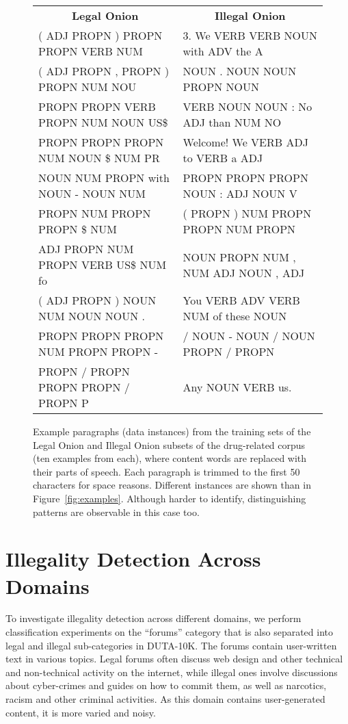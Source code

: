 \documentclass[11pt,a4paper,table]{article}
\begin{document}
\begin{figure*}[t]
\centering
\small
\begin{tabular}{l|l}
\multicolumn{1}{c}{\textbf{Legal Onion}} &
\multicolumn{1}{c}{\textbf{Illegal Onion}}\\[.1cm]
( ADJ PROPN ) PROPN PROPN VERB NUM &3. We VERB VERB NOUN with ADV the A\\[.1cm]
( ADJ PROPN , PROPN ) PROPN NUM NOU&NOUN . NOUN NOUN PROPN NOUN\\[.1cm]
PROPN PROPN VERB PROPN NUM NOUN US\$&VERB NOUN NOUN : No ADJ than NUM NO\\[.1cm]
PROPN PROPN PROPN NUM NOUN \$ NUM PR&Welcome! We VERB ADJ to VERB a ADJ \\[.1cm]
NOUN NUM PROPN with NOUN - NOUN NUM&PROPN PROPN PROPN NOUN : ADJ NOUN V\\[.1cm]
PROPN NUM PROPN PROPN \$ NUM&( PROPN ) NUM PROPN PROPN NUM PROPN\\[.1cm]
ADJ PROPN NUM PROPN VERB US\$ NUM fo&NOUN PROPN NUM , NUM ADJ NOUN , ADJ\\[.1cm]
( ADJ PROPN ) NOUN NUM NOUN NOUN . &You VERB ADV VERB NUM of these NOUN\\[.1cm]
PROPN PROPN PROPN NUM PROPN PROPN -&/ NOUN - NOUN / NOUN PROPN / PROPN \\[.1cm]
PROPN / PROPN PROPN PROPN / PROPN P&Any NOUN VERB us.\\[.1cm]
\end{tabular}
\caption{Example paragraphs (data instances) from the training sets of the Legal Onion and
Illegal Onion subsets of the drug-related corpus (ten examples from each),
where content words are replaced with their parts of speech.
Each paragraph is trimmed to the first 50 characters for space reasons.
Different instances are shown than in Figure~\ref{fig:examples}.
Although harder to identify, distinguishing patterns are observable in this case too.
\label{fig:examples_poscontent}}
\vspace{-.2cm}
\end{figure*}

\section{Illegality Detection Across Domains} \label{sec:cross_domains}

To investigate illegality detection across different domains, %
we perform classification experiments on the  ``forums'' category that is also separated into legal and illegal sub-categories in DUTA-10K.
The forums  contain user-written text in various topics. Legal forums often discuss web design and other technical
and non-technical activity on the internet, while illegal ones involve
discussions about cyber-crimes and guides on how to commit them,
as well as narcotics, racism and other criminal activities.
As this domain contains user-generated content, it is more varied
and noisy.
\end{document}
